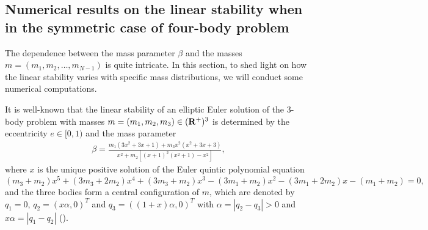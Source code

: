 \documentclass[11pt]{article}
\newtheorem{theorem}[lemma]{Theorem}
\def\be{\begin{equation}}
\def\ee{\end{equation}}
\def\lb{\label}
\def\R{{\bf R}}
\def\bb{{\beta}}
\begin{document}














\subsection{Numerical results on the linear stability when 
in the symmetric case of four-body problem}
\label{subsec:3.2}
The dependence between the mass parameter $\beta$ and the masses $m=(m_1,m_2,\ldots,m_{N-1})$
is quite intricate.
In this section, to shed light on how the linear stability varies with specific mass distributions, we will conduct some numerical computations.

It is well-known that the linear stability of an elliptic Euler solution
of the $3$-body problem with masses $m=(m_1,m_2,m_3)\in (\R^+)^3$ is determined by the
eccentricity $e\in [0,1)$ and the mass parameter
\begin{align}\lb{1.4}
  \bb = \frac{m_1(3x^2+3x+1)+m_3x^2(x^2+3x+3)}{x^2+m_2[(x+1)^2(x^2+1)-x^2]},
\end{align}
where $x$ is the unique positive solution of the Euler quintic polynomial equation
\be (m_3+m_2)x^5+(3m_3+2m_2)x^4+(3m_3+m_2)x^3-(3m_1+m_2)x^2-(3m_1+2m_2)x-(m_1+m_2)=0, \lb{Euler.quintic.polynomial}
\ee
and the three bodies form a central configuration of $m$, which are denoted by $q_1=0$,
$q_2=(x\alpha,0)^T$ and $q_3=((1+x)\alpha,0)^T$ with $\alpha=|q_2-q_3|>0$ and $x\alpha=|q_1-q_2|$ (\cite{Zhou2017}).
\end{document}
